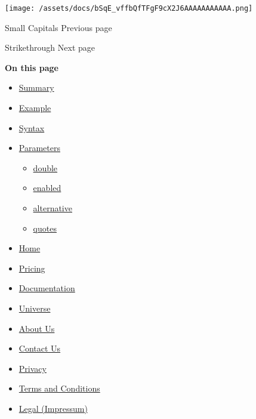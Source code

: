 \texttt{[image: /assets/docs/bSqE\_vffbQfTFgF9cX2J6AAAAAAAAAAA.png]}

\href{/docs/reference/text/smallcaps/}{\pandocbounded{}}

{ Small Capitals } { Previous page }

\href{/docs/reference/text/strike/}{\pandocbounded{}}

{ Strikethrough } { Next page }

\textbf{On this page}

\begin{itemize}
\tightlist
\item
  \hyperref[summary]{Summary}
\item
  \hyperref[example]{Example}
\item
  \hyperref[syntax]{Syntax}
\item
  \hyperref[parameters]{Parameters}

  \begin{itemize}
  \tightlist
  \item
    \hyperref[parameters-double]{double}
  \item
    \hyperref[parameters-enabled]{enabled}
  \item
    \hyperref[parameters-alternative]{alternative}
  \item
    \hyperref[parameters-quotes]{quotes}
  \end{itemize}
\end{itemize}

\begin{itemize}
\tightlist
\item
  \href{/}{Home}
\item
  \href{/pricing/}{Pricing}
\item
  \href{/docs/}{Documentation}
\item
  \href{/universe/}{Universe}
\item
  \href{/about/}{About Us}
\item
  \href{/contact/}{Contact Us}
\item
  \href{/privacy/}{Privacy}
\item
  \href{https://typst.app/terms}{Terms and Conditions}
\item
  \href{/legal/}{Legal (Impressum)}
\end{itemize}

